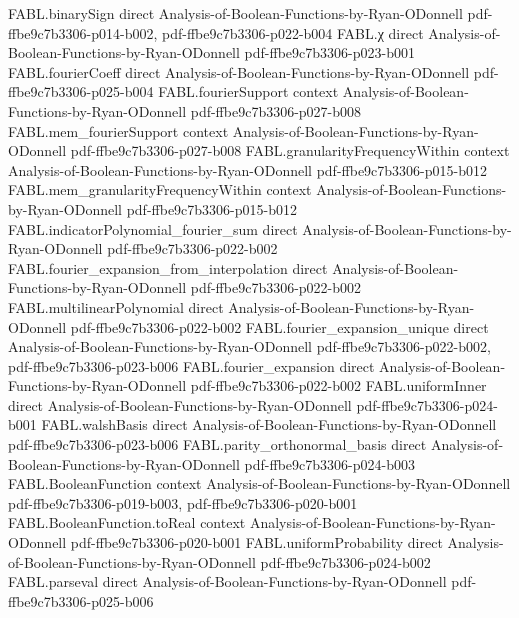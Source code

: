 \begin{theorem}
\proofstep
  {FABL.binarySign}
  {direct}
  {Analysis-of-Boolean-Functions-by-Ryan-ODonnell}
  {pdf-ffbe9c7b3306-p014-b002,
    pdf-ffbe9c7b3306-p022-b004}
\proofstep
  {FABL.χ}
  {direct}
  {Analysis-of-Boolean-Functions-by-Ryan-ODonnell}
  {pdf-ffbe9c7b3306-p023-b001}
\proofstep
  {FABL.fourierCoeff}
  {direct}
  {Analysis-of-Boolean-Functions-by-Ryan-ODonnell}
  {pdf-ffbe9c7b3306-p025-b004}
\proofstep
  {FABL.fourierSupport}
  {context}
  {Analysis-of-Boolean-Functions-by-Ryan-ODonnell}
  {pdf-ffbe9c7b3306-p027-b008}
\proofstep
  {FABL.mem_fourierSupport}
  {context}
  {Analysis-of-Boolean-Functions-by-Ryan-ODonnell}
  {pdf-ffbe9c7b3306-p027-b008}
\proofstep
  {FABL.granularityFrequencyWithin}
  {context}
  {Analysis-of-Boolean-Functions-by-Ryan-ODonnell}
  {pdf-ffbe9c7b3306-p015-b012}
\proofstep
  {FABL.mem_granularityFrequencyWithin}
  {context}
  {Analysis-of-Boolean-Functions-by-Ryan-ODonnell}
  {pdf-ffbe9c7b3306-p015-b012}
\proofstep
  {FABL.indicatorPolynomial_fourier_sum}
  {direct}
  {Analysis-of-Boolean-Functions-by-Ryan-ODonnell}
  {pdf-ffbe9c7b3306-p022-b002}
\proofstep
  {FABL.fourier_expansion_from_interpolation}
  {direct}
  {Analysis-of-Boolean-Functions-by-Ryan-ODonnell}
  {pdf-ffbe9c7b3306-p022-b002}
\proofstep
  {FABL.multilinearPolynomial}
  {direct}
  {Analysis-of-Boolean-Functions-by-Ryan-ODonnell}
  {pdf-ffbe9c7b3306-p022-b002}
\proofstep
  {FABL.fourier_expansion_unique}
  {direct}
  {Analysis-of-Boolean-Functions-by-Ryan-ODonnell}
  {pdf-ffbe9c7b3306-p022-b002,
    pdf-ffbe9c7b3306-p023-b006}
\proofstep
  {FABL.fourier_expansion}
  {direct}
  {Analysis-of-Boolean-Functions-by-Ryan-ODonnell}
  {pdf-ffbe9c7b3306-p022-b002}
\proofstep
  {FABL.uniformInner}
  {direct}
  {Analysis-of-Boolean-Functions-by-Ryan-ODonnell}
  {pdf-ffbe9c7b3306-p024-b001}
\proofstep
  {FABL.walshBasis}
  {direct}
  {Analysis-of-Boolean-Functions-by-Ryan-ODonnell}
  {pdf-ffbe9c7b3306-p023-b006}
\proofstep
  {FABL.parity_orthonormal_basis}
  {direct}
  {Analysis-of-Boolean-Functions-by-Ryan-ODonnell}
  {pdf-ffbe9c7b3306-p024-b003}
\proofstep
  {FABL.BooleanFunction}
  {context}
  {Analysis-of-Boolean-Functions-by-Ryan-ODonnell}
  {pdf-ffbe9c7b3306-p019-b003,
    pdf-ffbe9c7b3306-p020-b001}
\proofstep
  {FABL.BooleanFunction.toReal}
  {context}
  {Analysis-of-Boolean-Functions-by-Ryan-ODonnell}
  {pdf-ffbe9c7b3306-p020-b001}
\proofstep
  {FABL.uniformProbability}
  {direct}
  {Analysis-of-Boolean-Functions-by-Ryan-ODonnell}
  {pdf-ffbe9c7b3306-p024-b002}
\proofstep
  {FABL.parseval}
  {direct}
  {Analysis-of-Boolean-Functions-by-Ryan-ODonnell}
  {pdf-ffbe9c7b3306-p025-b006}

\end{theorem}
